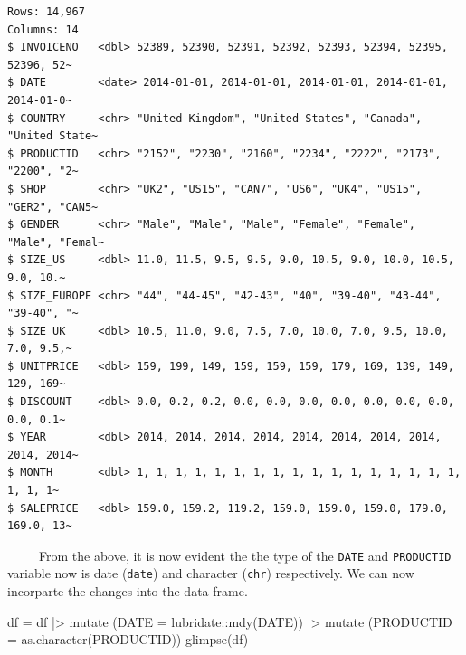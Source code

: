 \documentclass[
  letterpaper,
  DIV=11,
  numbers=noendperiod]{scrreprt}
\newenvironment{Shaded}{\begin{snugshade}}{\end{snugshade}}
\newcommand{\AttributeTok}[1]{\textcolor[rgb]{0.40,0.45,0.13}{#1}}
\newcommand{\FunctionTok}[1]{\textcolor[rgb]{0.28,0.35,0.67}{#1}}
\newcommand{\NormalTok}[1]{\textcolor[rgb]{0.00,0.23,0.31}{#1}}
\newcommand{\OtherTok}[1]{\textcolor[rgb]{0.00,0.23,0.31}{#1}}
\newcommand{\SpecialCharTok}[1]{\textcolor[rgb]{0.37,0.37,0.37}{#1}}
\begin{document}
\begin{verbatim}
Rows: 14,967
Columns: 14
$ INVOICENO   <dbl> 52389, 52390, 52391, 52392, 52393, 52394, 52395, 52396, 52~
$ DATE        <date> 2014-01-01, 2014-01-01, 2014-01-01, 2014-01-01, 2014-01-0~
$ COUNTRY     <chr> "United Kingdom", "United States", "Canada", "United State~
$ PRODUCTID   <chr> "2152", "2230", "2160", "2234", "2222", "2173", "2200", "2~
$ SHOP        <chr> "UK2", "US15", "CAN7", "US6", "UK4", "US15", "GER2", "CAN5~
$ GENDER      <chr> "Male", "Male", "Male", "Female", "Female", "Male", "Femal~
$ SIZE_US     <dbl> 11.0, 11.5, 9.5, 9.5, 9.0, 10.5, 9.0, 10.0, 10.5, 9.0, 10.~
$ SIZE_EUROPE <chr> "44", "44-45", "42-43", "40", "39-40", "43-44", "39-40", "~
$ SIZE_UK     <dbl> 10.5, 11.0, 9.0, 7.5, 7.0, 10.0, 7.0, 9.5, 10.0, 7.0, 9.5,~
$ UNITPRICE   <dbl> 159, 199, 149, 159, 159, 159, 179, 169, 139, 149, 129, 169~
$ DISCOUNT    <dbl> 0.0, 0.2, 0.2, 0.0, 0.0, 0.0, 0.0, 0.0, 0.0, 0.0, 0.0, 0.1~
$ YEAR        <dbl> 2014, 2014, 2014, 2014, 2014, 2014, 2014, 2014, 2014, 2014~
$ MONTH       <dbl> 1, 1, 1, 1, 1, 1, 1, 1, 1, 1, 1, 1, 1, 1, 1, 1, 1, 1, 1, 1~
$ SALEPRICE   <dbl> 159.0, 159.2, 119.2, 159.0, 159.0, 159.0, 179.0, 169.0, 13~
\end{verbatim}

~~~~~From the above, it is now evident the the type of the \texttt{DATE}
and \texttt{PRODUCTID} variable now is date (\texttt{date}) and
character (\texttt{chr}) respectively. We can now incorparte the changes
into the data frame.

\begin{Shaded}
\begin{Highlighting}[]
\NormalTok{df }\OtherTok{=}\NormalTok{ df }\SpecialCharTok{|\textgreater{}}
    \FunctionTok{mutate}\NormalTok{ (}\AttributeTok{DATE =}\NormalTok{ lubridate}\SpecialCharTok{::}\FunctionTok{mdy}\NormalTok{(DATE)) }\SpecialCharTok{|\textgreater{}}
    \FunctionTok{mutate}\NormalTok{ (}\AttributeTok{PRODUCTID =} \FunctionTok{as.character}\NormalTok{(PRODUCTID)) }
\FunctionTok{glimpse}\NormalTok{(df)}
\end{Highlighting}
\end{Shaded}
\end{document}
